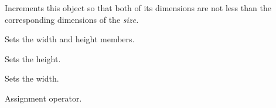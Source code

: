 
Increments this object so that both of its dimensions are not less than the
corresponding dimensions of the \it{size}.




\label{wxsizeset}


Sets the width and height members.

\label{wxsizesetheight}


Sets the height.

\label{wxsizesetwidth}


Sets the width.



Assignment operator.


